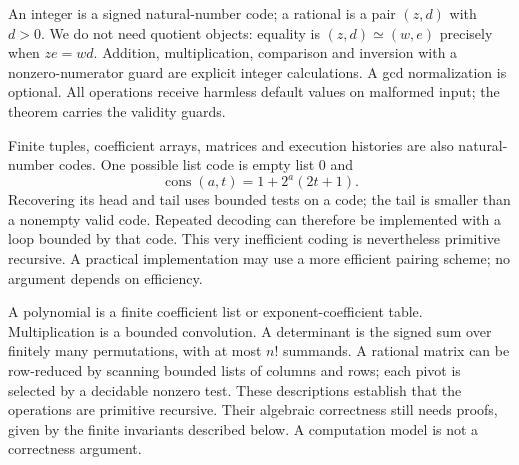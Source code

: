 An integer is a signed natural-number code; a rational is a pair
\((z,d)\) with \(d>0\). We do not need quotient objects: equality is
\((z,d)\simeq(w,e)\) precisely when \(ze=wd\). Addition, multiplication,
comparison and inversion with a nonzero-numerator guard are explicit
integer calculations. A gcd normalization is optional. All operations
receive harmless default values on malformed input; the theorem carries
the validity guards.

Finite tuples, coefficient arrays, matrices and execution histories are
also natural-number codes. One possible list code is empty list \(0\)
and
\[
 \operatorname{cons}(a,t)=1+2^a(2t+1).
\]
Recovering its head and tail uses bounded tests on a code; the tail is
smaller than a nonempty valid code. Repeated decoding can therefore be
implemented with a loop bounded by that code. This very inefficient coding
is nevertheless primitive recursive. A practical implementation may use
a more efficient pairing scheme; no argument depends on efficiency.

A polynomial is a finite coefficient list or exponent-coefficient table.
Multiplication is a bounded convolution. A determinant is the signed sum
over finitely many permutations, with at most \(n!\) summands. A rational
matrix can be row-reduced by scanning bounded lists of columns and rows;
each pivot is selected by a decidable nonzero test. These descriptions
establish that the operations are primitive recursive. Their algebraic
correctness still needs proofs, given by the finite invariants described
below. A computation model is not a correctness argument.

